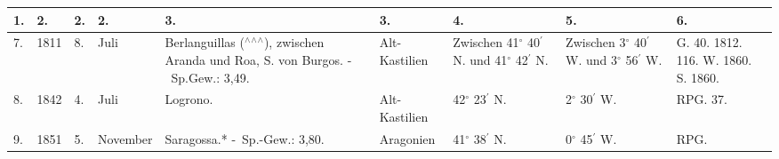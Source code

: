 \documentclass[a4paper, 11pt, oneside, polutonikogreek, german]{article}
\begin{document}
\begin{landscape}
\begin{table}[!ht]
    \centering
    \footnotesize
    \begin{tabular}{|l|l|l|l|p{40mm}|l|p{14mm}|p{14mm}|p{14mm}|}
    \hline
        1. & 2. & 2. & 2. & 3. & 3. & 4. & 5. & 6. \\ \hline
        7. & 1811 & 8. & Juli & Berlanguillas ($^\wedge$$^\wedge$$^\wedge$), zwischen Aranda und Roa, S. von Burgos. - Sp.Gew.: 3,49. & Alt-Kastilien & Zwischen 41$^\circ$ 40$^\prime$ N. und 41$^\circ$ 42$^\prime$ N. & Zwischen 3$^\circ$ 40$^\prime$ W. und 3$^\circ$ 56$^\prime$ W. & G. 40. 1812. 116. W. 1860. S. 1860. \\ \hline
        8. & 1842 & 4. & Juli & Logrono. & Alt-Kastilien & 42$^\circ$ 23$^\prime$ N. & 2$^\circ$ 30$^\prime$ W. & RPG. 37. \\ \hline
        9. & 1851 & 5. & November & Saragossa.* - Sp.-Gew.: 3,80. & Aragonien & 41$^\circ$ 38$^\prime$ N. & 0$^\circ$ 45$^\prime$ W. & RPG. \\ \hline
    \end{tabular}
\end{table}
\end{landscape}
\clearpage
\end{document}
